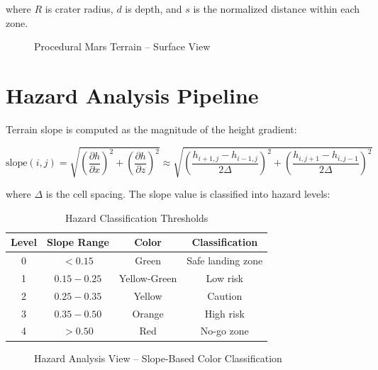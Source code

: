 where $R$ is crater radius, $d$ is depth, and $s$ is the normalized distance within each zone.

\begin{figure}[h]
\centering
{}
\caption{Procedural Mars Terrain -- Surface View}
\label{fig:terrain_surface}
\end{figure}

\section{Hazard Analysis Pipeline}

Terrain slope is computed as the magnitude of the height gradient:

\begin{equation}
\text{slope}(i,j) = \sqrt{\left(\frac{\partial h}{\partial x}\right)^2 + \left(\frac{\partial h}{\partial z}\right)^2} \approx \sqrt{\left(\frac{h_{i+1,j} - h_{i-1,j}}{2\Delta}\right)^2 + \left(\frac{h_{i,j+1} - h_{i,j-1}}{2\Delta}\right)^2}
\end{equation}

where $\Delta$ is the cell spacing. The slope value is classified into hazard levels:

\begin{table}[h]
\centering
\caption{Hazard Classification Thresholds}
\label{tab:hazard_levels}
\begin{tabular}{|c|c|c|c|}
\hline
\textbf{Level} & \textbf{Slope Range} & \textbf{Color} & \textbf{Classification} \\
\hline
0 & $< 0.15$ & Green & Safe landing zone \\
\hline
1 & $0.15 - 0.25$ & Yellow-Green & Low risk \\
\hline
2 & $0.25 - 0.35$ & Yellow & Caution \\
\hline
3 & $0.35 - 0.50$ & Orange & High risk \\
\hline
4 & $> 0.50$ & Red & No-go zone \\
\hline
\end{tabular}
\end{table}

\begin{figure}[h]
\centering
{}
\caption{Hazard Analysis View -- Slope-Based Color Classification}
\label{fig:hazard_view}
\end{figure}

